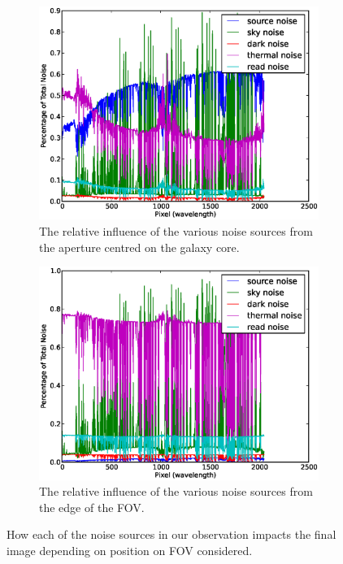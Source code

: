 \documentclass[11pt,twoside]{article}
\begin{document}
\begin{figure}[htp]
\centering  
\begin{subfigure}{0.5\textwidth}
\includegraphics[width=\textwidth]{noise_comp}
\caption{The relative influence of the various noise sources from the aperture centred on the galaxy core.}
\end{subfigure}%
\begin{subfigure}{0.5\textwidth}
\includegraphics[width=\textwidth]{noise_comp_edge}
\caption{The relative influence of the various noise sources from the edge of the FOV.}
\end{subfigure}
\caption{How each of the noise sources in our observation impacts the final image depending on position on FOV considered.}
\label{relnoise}
\end{figure}
\end{document}
